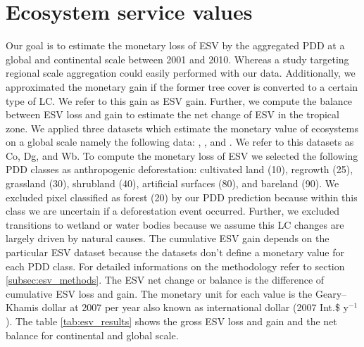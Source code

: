 	\section{Ecosystem service values}
		Our goal is to estimate the monetary loss of \ac{ESV} by the aggregated \ac{PDD} at a global and continental scale between 2001 and 2010. Whereas a study targeting regional scale aggregation could easily performed with our data. Additionally, we approximated the monetary gain if the former tree cover is converted to a certain type of \ac{LC}. We refer to this gain as \ac{ESV} gain. Further, we compute the balance between \ac{ESV} loss and gain to estimate the net change of \ac{ESV} in the tropical zone. We applied three datasets which estimate the monetary value of ecosystems on a global scale namely the following data: \citet{Groot2012}, \citet{Costanza2014}, and \citet{Siikamaki2015}. We refer to this datasets as Co, Dg, and Wb. To compute the monetary loss of \ac{ESV} we selected the following \ac{PDD} classes as anthropogenic deforestation: cultivated land (10), regrowth (25), grassland (30), shrubland (40), artificial surfaces (80), and bareland (90). We excluded pixel classified as forest (20) by our \ac{PDD} prediction because within this class we are uncertain if a deforestation event occurred. Further, we excluded transitions to wetland or water bodies because we assume this \ac{LC} changes are largely driven by natural causes. The cumulative \ac{ESV} gain depends on the particular \ac{ESV} dataset because the datasets don't define a monetary value for each \ac{PDD} class. For detailed informations on the methodology refer to section \ref{subsec:esv_methods}. The \ac{ESV} net change or balance is the difference of cumulative \ac{ESV} loss and gain. The monetary unit for each value is the Geary–Khamis dollar at 2007 per year also known as international dollar (2007 Int.\$ y$^{-1}$). The table \ref{tab:esv_results} shows the gross \ac{ESV} loss and gain and the net balance for continental and global scale.

